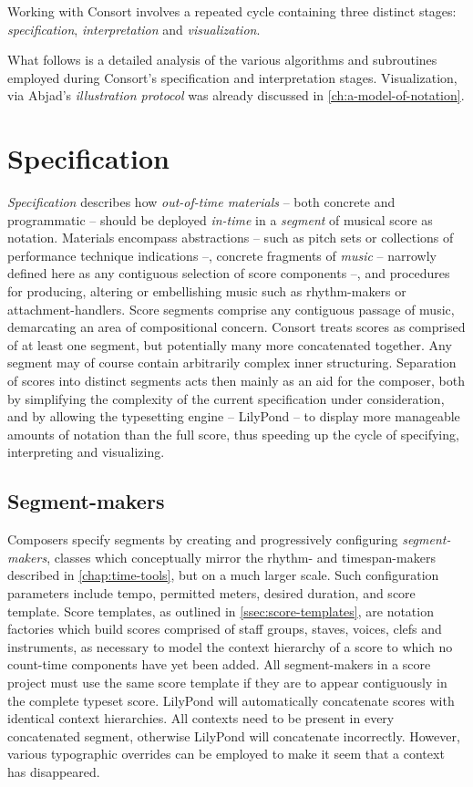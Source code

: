 Working with Consort involves a repeated cycle containing three
distinct stages: \emph{specification}, \emph{interpretation} and
\emph{visualization}.

What follows is a detailed analysis of the various algorithms and subroutines
employed during Consort's specification and interpretation stages.
Visualization, via Abjad's \emph{illustration protocol} was already discussed
in \autoref{ch:a-model-of-notation}.

\section{Specification}
\label{sec:specification}

\emph{Specification} describes how \emph{out-of-time materials} -- both
concrete and programmatic -- should be deployed \emph{in-time} in a
\emph{segment} of musical score as notation. Materials encompass abstractions
-- such as pitch sets or collections of performance technique indications --,
concrete fragments of \emph{music} -- narrowly defined here as any contiguous
selection of score components --, and procedures for producing, altering or
embellishing music such as rhythm-makers or attachment-handlers. Score segments
comprise any contiguous passage of music, demarcating an area of compositional
concern. Consort treats scores as comprised of at least one segment, but
potentially many more concatenated together. Any segment may of course contain
arbitrarily complex inner structuring. Separation of scores into distinct
segments acts then mainly as an aid for the composer, both by simplifying the
complexity of the current specification under consideration, and by allowing
the typesetting engine -- LilyPond -- to display more manageable amounts of
notation than the full score, thus speeding up the cycle of specifying,
interpreting and visualizing.

\subsection{Segment-makers}
\label{ssec:segment-makers}

Composers specify segments by creating and progressively configuring
\emph{segment-makers}, classes which conceptually mirror the rhythm- and
timespan-makers described in \autoref{chap:time-tools}, but on a much larger
scale. Such configuration parameters include tempo, permitted meters, desired
duration, and score template. Score templates, as outlined in
\autoref{ssec:score-templates}, are notation factories which build scores
comprised of staff groups, staves, voices, clefs and instruments, as necessary
to model the context hierarchy of a score to which no count-time components
have yet been added. All segment-makers in a score project must use the same
score template if they are to appear contiguously in the complete typeset
score. LilyPond will automatically concatenate scores with identical context
hierarchies. All contexts need to be present in every concatenated segment,
otherwise LilyPond will concatenate incorrectly. However, various typographic
overrides can be employed to make it seem that a context has disappeared.

